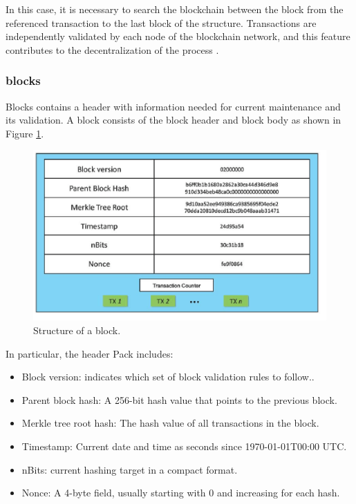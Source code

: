 In this case, it is necessary to search the blockchain between the block from the referenced transaction to the last block of the structure. Transactions are independently validated by each node of the blockchain network, and this feature contributes to the decentralization of the process \cite{greve2018blockchain}.

\subsubsection{blocks}\label{sec:blocks}
Blocks contains a header with information needed for current maintenance and its validation. A block consists of the block header and block body as shown in Figure \ref{fig:block}. 

\begin{figure}[htbp]
\begin{center}
  \includegraphics[scale=0.5]{images/blockStructure.png}
\caption{Structure of a block. \cite{zheng2016blockchain}}
\label{fig:block}
\end{center}
\end{figure}

In particular, the header Pack includes:

\begin{itemize}
\item Block version: indicates which set of block validation rules to follow..
\item Parent block hash: A 256-bit hash value that points to the previous block.
\item Merkle tree root hash: The hash value of all transactions in the block.
\item Timestamp: Current date and time as seconds since 1970-01-01T00:00 UTC.
\item  nBits: current hashing target in a compact format.
\item Nonce: A 4-byte field, usually starting with 0 and increasing for each hash.
\end{itemize}

